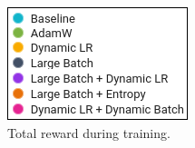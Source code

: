 \documentclass[10pt,conference]{IEEEtran}
\begin{document}
\begin{figure}[htbp]
  \centering
  \begin{minipage}[b]{\textwidth}
    \centering
  \end{minipage}
  \hfill
  \begin{minipage}[b]{\textwidth}
    \centering
    \includegraphics{figs/legend.png}
    \caption{Total reward during training.}
    \label{fig:total_reward}
  \end{minipage}
\end{figure}
\end{document}
